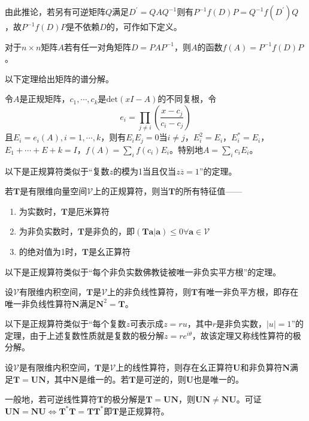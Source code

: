 \documentclass[main.tex]{subfiles}
\begin{document}
由此推论，若另有可逆矩阵$Q$满足$D^\prime=QAQ^{-1}$则有$P^{-1}f\left(D\right)P=Q^{-1}f\left(D^\prime\right)Q$，故$P^{-1}f\left(D\right)P$是不依赖$D$的，可作如下定义。

\begin{definition}[矩阵的函数]
对于$n\times n$矩阵$A$若有任一对角矩阵$D=PAP^{-1}$，则$A$的函数$f\left(A\right)=P^{-1}f\left(D\right)P$。
\end{definition}

以下定理给出矩阵的谱分解。

\begin{theorem}
令$A$是正规矩阵，$c_1,\cdots,c_k$是$\mathrm{det}\left(xI-A\right)$的不同复根，令
\[e_i=\prod_{j\neq i}\left(\frac{x-c_j}{c_i-c_j}\right)\]
且$E_i=e_i\left(A\right),i=1,\cdots,k$，则有$E_iE_j=0$当$i\neq j$，$E_i^2=E_i$，$E_i^*=E_i$，$E_1+\cdots+E+k=I$，$f\left(A\right)=\sum_if\left(c_i\right)E_i$。特别地$A=\sum_ic_iE_i$。
\end{theorem}

以下是正规算符类似于“复数$z$的模为1当且仅当$z\overline{z}=1$”的定理。

\begin{theorem}
若$\mathbf{T}$是有限维向量空间$\mathcal{V}$上的正规算符，则当$\mathbf{T}$的所有特征值——
\begin{enumerate}
    \item 为实数时，$\mathbf{T}$是厄米算符
    \item 为非负实数时，$\mathbf{T}$是非负的，即$\left(\mathbf{Ta}|\mathbf{a}\right)\leq 0\forall\mathbf{a}\in\mathcal{V}$
    \item 的绝对值为1时，$\mathbf{T}$是幺正算符
\end{enumerate}
\end{theorem}

以下是正规算符类似于“每个非负实数佛教徒被唯一非负实平方根”的定理。

\begin{theorem}
设$\mathcal{V}$有限维内积空间，$\mathbf{T}$是$\mathcal{V}$上的非负线性算符，则$\mathbf{T}$有唯一非负平方根，即存在唯一非负线性算符$\mathbf{N}$满足$\mathbf{N}^2=\mathbf{T}$。
\end{theorem}

以下是正规算符类似于“每个复数$z$可表示成$z=ru$，其中$r$是非负实数，$\left|u\right|=1$”的定理，由于上述复数性质就是复数的极分解$z=re^{i\theta}$，故该定理又称线性算符的极分解。

\begin{theorem}
设$\mathcal{V}$是有限维内积空间，$\mathbf{T}$是$\mathcal{V}$上的线性算符，则存在幺正算符$\mathbf{U}$和非负算符$\mathbf{N}$满足$\mathbf{T}=\mathbf{UN}$，其中$\mathbf{N}$是维一的。若$\mathbf{T}$是可逆的，则$\mathbf{U}$也是唯一的。
\end{theorem}

一般地，若可逆线性算符$\mathbf{T}$的极分解是$\mathbf{T}=\mathbf{UN}$，则$\mathbf{UN}\neq\mathbf{NU}$。可证$\mathbf{UN}=\mathbf{NU}\Leftrightarrow\mathbf{T}^*\mathbf{T}=\mathbf{TT}^*$即$\mathbf{T}$是正规算符。
\end{document}

